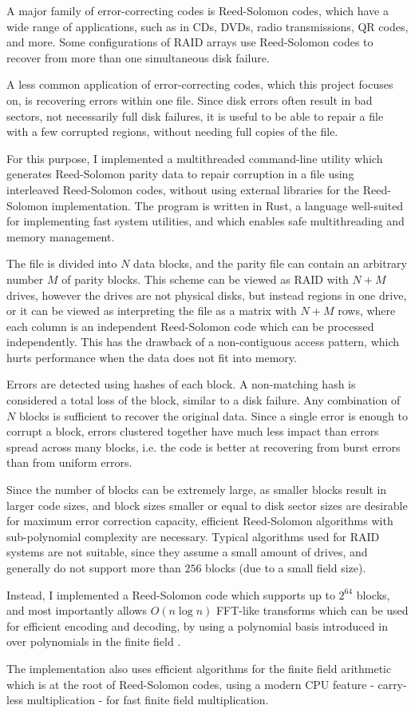 A major family of error-correcting codes is Reed-Solomon codes, which have a wide range of applications, such as in CDs, DVDs, radio transmissions, QR codes, and more.
Some configurations of RAID arrays use Reed-Solomon codes to recover from more than one simultaneous disk failure.

A less common application of error-correcting codes, which this project focuses on, is recovering errors within one file.
Since disk errors often result in bad sectors, not necessarily full disk failures, it is useful to be able to repair a file with a few corrupted regions, without needing full copies of the file.

For this purpose, I implemented a multithreaded command-line utility which generates Reed-Solomon parity data to repair corruption in a file using interleaved Reed-Solomon codes, without using external libraries for the Reed-Solomon implementation.
The program is written in Rust, a language well-suited for implementing fast system utilities, and which enables safe multithreading and memory management.

The file is divided into $N$ data blocks, and the parity file can contain an arbitrary number $M$ of parity blocks.
This scheme can be viewed as RAID with $N + M$ drives, however the drives are not physical disks, but instead regions in one drive,
or it can be viewed as interpreting the file as a matrix with $N + M$ rows, where each column is an independent Reed-Solomon code which can be processed independently.
This has the drawback of a non-contiguous access pattern, which hurts performance when the data does not fit into memory.

Errors are detected using hashes of each block. A non-matching hash is considered a total loss of the block, similar to a disk failure. Any combination of $N$ blocks is sufficient to recover the original data.
Since a single error is enough to corrupt a block, errors clustered together have much less impact than errors spread across many blocks, i.e. the code is better at recovering from burst errors than from uniform errors.

Since the number of blocks can be extremely large, as smaller blocks result in larger code sizes, and block sizes smaller or equal to disk sector sizes are desirable for maximum error correction capacity,
efficient Reed-Solomon algorithms with sub-polynomial complexity are necessary.
Typical algorithms used for RAID systems are not suitable, since they assume a small amount of drives, and generally do not support more than $256$ blocks (due to a small field size).

Instead, I implemented a Reed-Solomon code which supports up to $2^{64}$ blocks, and most importantly allows $O(n \log n)$ FFT-like transforms which can be used for efficient encoding and decoding,
by using a polynomial basis introduced in \cite{novel-poly} over polynomials in the finite field .

The implementation also uses efficient algorithms for the finite field arithmetic which is at the root of Reed-Solomon codes, using a modern CPU feature - carry-less multiplication \cite{intel-clmul} - for fast finite field multiplication.
